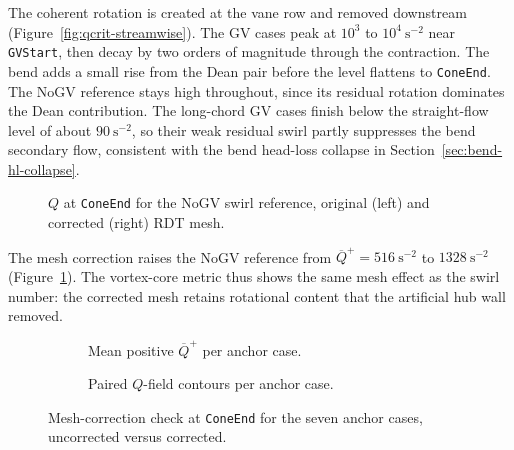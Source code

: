 The coherent rotation is created at the vane row and removed downstream (Figure~\ref{fig:qcrit-streamwise}). The GV cases peak at \(10^{3}\) to \(10^{4}~\mathrm{s}^{-2}\) near \texttt{GVStart}, then decay by two orders of magnitude through the contraction. The bend adds a small rise from the Dean pair before the level flattens to \texttt{ConeEnd}. The NoGV reference stays high throughout, since its residual rotation dominates the Dean contribution. The long-chord GV cases finish below the straight-flow level of about \(90~\mathrm{s}^{-2}\), so their weak residual swirl partly suppresses the bend secondary flow, consistent with the bend head-loss collapse in Section~\ref{sec:bend-hl-collapse}.

\begin{figure}[H]
\centering
{}
\caption[$Q$ at \texttt{ConeEnd}, NoGV mesh check]{$Q$ at \texttt{ConeEnd} for the NoGV swirl reference, original (left) and corrected (right) RDT mesh.}
\label{fig:qcrit-grid-nogv}
\end{figure}

The mesh correction raises the NoGV reference from \(\overline{Q}^{+} = 516~\mathrm{s}^{-2}\) to \(1328~\mathrm{s}^{-2}\) (Figure~\ref{fig:qcrit-grid-nogv}). The vortex-core metric thus shows the same mesh effect as the swirl number: the corrected mesh retains rotational content that the artificial hub wall removed.

\begin{figure}[H]
\centering
\begin{subfigure}[t]{0.85\linewidth}
    \centering
    \caption[Mean positive $\overline{Q}^{+}$]{Mean positive $\overline{Q}^{+}$ per anchor case.}
    \label{fig:qcrit-anchor-paired-bars}
\end{subfigure}
\vspace{0.4em}
\begin{subfigure}[t]{0.85\linewidth}
    \centering
    \caption[Paired $Q$-field contours]{Paired $Q$-field contours per anchor case.}
    \label{fig:qcrit-anchor-paired-contour}
\end{subfigure}
\caption[Mesh-correction check at \texttt{ConeEnd}]{Mesh-correction check at \texttt{ConeEnd} for the seven anchor cases, uncorrected versus corrected.}
\label{fig:qcrit-anchor-paired}
\end{figure}

